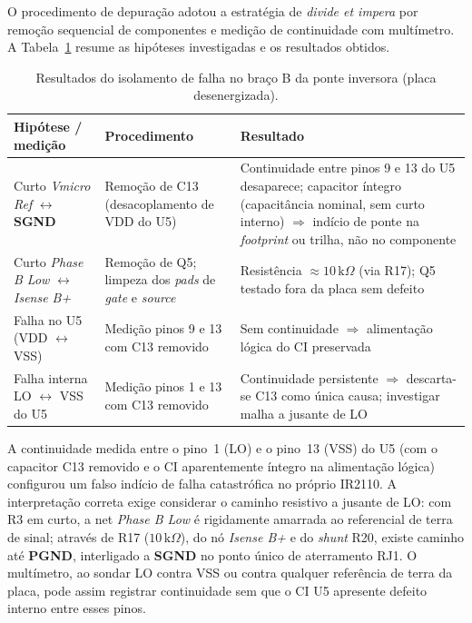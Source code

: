 O procedimento de depuração adotou a estratégia de \textit{divide et impera} por remoção sequencial de componentes e medição de continuidade com multímetro. A Tabela~\ref{tab:depuracao_curto_fase_b} resume as hipóteses investigadas e os resultados obtidos.

\begin{table}[H]
    \centering
    \caption{Resultados do isolamento de falha no braço B da ponte inversora (placa desenergizada).}
    \label{tab:depuracao_curto_fase_b}
    \begin{tabular}{p{4.2cm}p{5.8cm}p{4.5cm}}
        \toprule
        \textbf{Hipótese / medição} & \textbf{Procedimento} & \textbf{Resultado} \\
        \midrule
        Curto \textit{Vmicro Ref} $\leftrightarrow$ \textbf{SGND} &
        Remoção de C13 (desacoplamento de VDD do U5) &
        Continuidade entre pinos 9 e 13 do U5 desaparece; capacitor íntegro (capacitância nominal, sem curto interno) $\Rightarrow$ indício de ponte na \textit{footprint} ou trilha, não no componente \\
        Curto \textit{Phase B Low} $\leftrightarrow$ \textit{Isense B+} &
        Remoção de Q5; limpeza dos \textit{pads} de \textit{gate} e \textit{source} &
        Resistência $\approx 10\,\text{k}\Omega$ (via R17); Q5 testado fora da placa sem defeito \\
        Falha no U5 (VDD $\leftrightarrow$ VSS) &
        Medição pinos 9 e 13 com C13 removido &
        Sem continuidade $\Rightarrow$ alimentação lógica do CI preservada \\
        Falha interna LO $\leftrightarrow$ VSS do U5 &
        Medição pinos 1 e 13 com C13 removido &
        Continuidade persistente $\Rightarrow$ descarta-se C13 como única causa; investigar malha a jusante de LO \\
        \bottomrule
    \end{tabular}
\end{table}

A continuidade medida entre o pino~1 (LO) e o pino~13 (VSS) do U5 (com o capacitor C13 removido e o CI aparentemente íntegro na alimentação lógica) configurou um falso indício de falha catastrófica no próprio IR2110. A interpretação correta exige considerar o caminho resistivo a jusante de LO: com R3 em curto, a net \textit{Phase B Low} é rigidamente amarrada ao referencial de terra de sinal; através de R17 ($10\,\text{k}\Omega$), do nó \textit{Isense B+} e do \textit{shunt} R20, existe caminho até \textbf{PGND}, interligado a \textbf{SGND} no ponto único de aterramento RJ1. O multímetro, ao sondar LO contra VSS ou contra qualquer referência de terra da placa, pode assim registrar continuidade sem que o CI U5 apresente defeito interno entre esses pinos.

